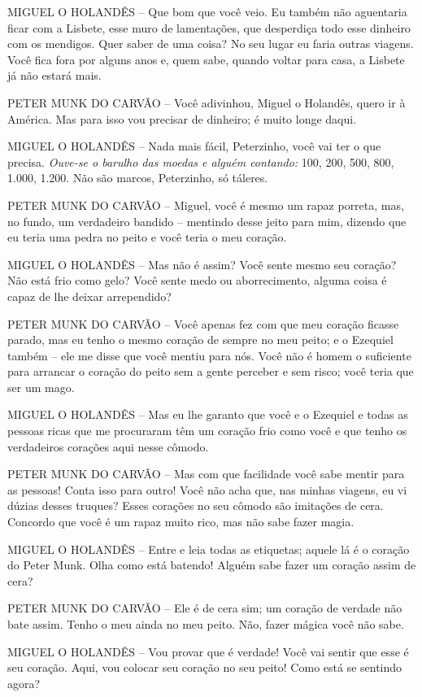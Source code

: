 MIGUEL O HOLANDÊS -- Que bom que você veio. Eu também não aguentaria
ficar com a Lisbete, esse muro de lamentações, que desperdiça todo esse
dinheiro com os mendigos. Quer saber de uma coisa? No seu lugar eu faria
outras viagens. Você fica fora por alguns anos e, quem sabe, quando
voltar para casa, a Lisbete já não estará mais.

PETER MUNK DO CARVÃO -- Você adivinhou, Miguel o Holandês, quero ir à
América. Mas para isso vou precisar de dinheiro; é muito longe daqui.

MIGUEL O HOLANDÊS -- Nada mais fácil, Peterzinho, você vai ter o que
precisa. \emph{Ouve-se o barulho das moedas e alguém contando:} 100,
200, 500, 800, 1.000, 1.200. Não são marcos, Peterzinho, só táleres.

PETER MUNK DO CARVÃO -- Miguel, você é mesmo um rapaz porreta, mas, no
fundo, um verdadeiro bandido -- mentindo desse jeito para mim, dizendo
que eu teria uma pedra no peito e você teria o meu coração.

MIGUEL O HOLANDÊS -- Mas não é assim? Você sente mesmo seu coração? Não
está frio como gelo? Você sente medo ou aborrecimento, alguma coisa é
capaz de lhe deixar arrependido?

PETER MUNK DO CARVÃO -- Você apenas fez com que meu coração ficasse
parado, mas eu tenho o mesmo coração de sempre no meu peito; e o
Ezequiel também -- ele me disse que você mentiu para nós. Você não é
homem o suficiente para arrancar o coração do peito sem a gente perceber
e sem risco; você teria que ser um mago.

MIGUEL O HOLANDÊS -- Mas eu lhe garanto que você e o Ezequiel e todas as
pessoas ricas que me procuraram têm um coração frio como você e que
tenho os verdadeiros corações aqui nesse cômodo.

PETER MUNK DO CARVÃO -- Mas com que facilidade você sabe mentir para as
pessoas! Conta isso para outro! Você não acha que, nas minhas viagens,
eu vi dúzias desses truques? Esses corações no seu cômodo são imitações
de cera. Concordo que você é um rapaz muito rico, mas não sabe fazer
magia.

MIGUEL O HOLANDÊS -- Entre e leia todas as etiquetas; aquele lá é o
coração do Peter Munk. Olha como está batendo! Alguém sabe fazer um
coração assim de cera?

PETER MUNK DO CARVÃO -- Ele é de cera sim; um coração de verdade não
bate assim. Tenho o meu ainda no meu peito. Não, fazer mágica você não
sabe.

MIGUEL O HOLANDÊS -- Vou provar que é verdade! Você vai sentir que esse
é seu coração. Aqui, vou colocar seu coração no seu peito! Como está se
sentindo agora?

